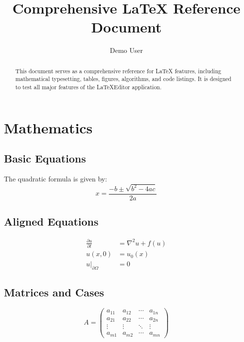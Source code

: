 \documentclass[11pt,a4paper]{article}
\title{Comprehensive LaTeX Reference Document}
\author{Demo User}
\date{}
\begin{document}
\maketitle

\begin{abstract}
This document serves as a comprehensive reference for LaTeX features, including mathematical
typesetting, tables, figures, algorithms, and code listings. It is designed to test all major
features of the LaTeXEditor application.
\end{abstract}

\tableofcontents

\section{Mathematics}

\subsection{Basic Equations}

The quadratic formula is given by:
\begin{equation}
    x = \frac{-b \pm \sqrt{b^2 - 4ac}}{2a}
    \label{eq:quadratic}
\end{equation}

\subsection{Aligned Equations}

\begin{align}
    \frac{\partial u}{\partial t} &= \nabla^2 u + f(u) \\
    u(x, 0) &= u_0(x) \\
    u|_{\partial\Omega} &= 0
    \label{eq:pde_system}
\end{align}

\subsection{Matrices and Cases}

\begin{equation}
    A = \begin{pmatrix}
        a_{11} & a_{12} & \cdots & a_{1n} \\
        a_{21} & a_{22} & \cdots & a_{2n} \\
        \vdots & \vdots & \ddots & \vdots \\
        a_{m1} & a_{m2} & \cdots & a_{mn}
    \end{pmatrix}
    \label{eq:matrix}
\end{equation}
\end{document}

